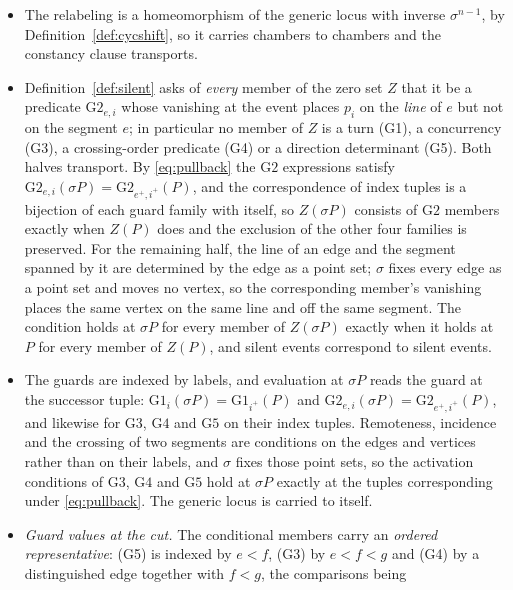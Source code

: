\begin{axiom}
\begin{itemize}
\item[(chambers)] The relabeling is a homeomorphism of the generic locus with
  inverse $\sigma^{n-1}$, by Definition~\ref{def:cycshift}, so it carries
  chambers to chambers and the constancy clause transports.
\item[(silence)] Definition~\ref{def:silent} asks of \emph{every} member of the
  zero set $Z$ that it be a predicate $\mathrm{G2}_{e,i}$ whose vanishing at the
  event places $p_i$ on the \emph{line} of $e$ but not on the segment $e$; in
  particular no member of $Z$ is a turn (G1), a concurrency (G3), a
  crossing-order predicate (G4) or a direction determinant (G5). Both halves
  transport. By \eqref{eq:pullback} the $\mathrm{G2}$ expressions satisfy
  $\mathrm{G2}_{e,i}(\sigma P)=\mathrm{G2}_{e^{+},i^{+}}(P)$, and the
  correspondence of index tuples is a bijection of each guard family with
  itself, so $Z(\sigma P)$ consists of $\mathrm{G2}$ members exactly when $Z(P)$
  does and the exclusion of the other four families is preserved. For the
  remaining half, the line of an edge and the segment spanned by it are
  determined by the edge as a point set; $\sigma$ fixes every edge as a point
  set and moves no vertex, so the corresponding member's vanishing places the
  same vertex on the same line and off the same segment. The condition holds at
  $\sigma P$ for every member of $Z(\sigma P)$ exactly when it holds at $P$ for
  every member of $Z(P)$, and silent events correspond to silent events.
\item[(genericity)] The guards are indexed by labels, and evaluation at
  $\sigma P$ reads the guard at the successor tuple:
  $\mathrm{G1}_i(\sigma P)=\mathrm{G1}_{i^{+}}(P)$ and
  $\mathrm{G2}_{e,i}(\sigma P)=\mathrm{G2}_{e^{+},i^{+}}(P)$, and likewise for
  $\mathrm{G3}$, $\mathrm{G4}$ and $\mathrm{G5}$ on their index tuples.
  Remoteness, incidence and the crossing of two segments are conditions on the
  edges and vertices rather than on their labels, and $\sigma$ fixes those point
  sets, so the activation conditions of $\mathrm{G3}$, $\mathrm{G4}$ and
  $\mathrm{G5}$ hold at $\sigma P$ exactly at the tuples corresponding under
  \eqref{eq:pullback}. The generic locus is carried to itself.
\item[(cut)]\emph{Guard values at the cut.} The conditional members carry an
  \emph{ordered representative}: (G5) is indexed by $e<f$, (G3) by $e<f<g$ and
  (G4) by a distinguished edge together with $f<g$, the comparisons being

\end{itemize}
\end{axiom}
